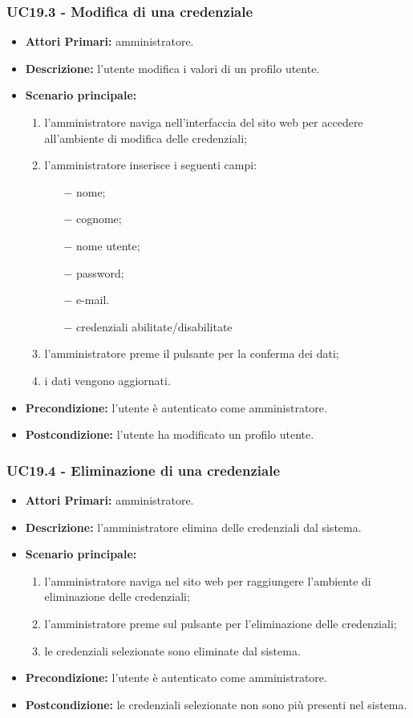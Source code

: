 \subsubsection{ UC19.3 - Modifica di una credenziale}
\begin{itemize}
	\item\textbf{Attori Primari:} 
	amministratore.
	\item\textbf{Descrizione:} 
	l'utente modifica i valori di un profilo utente.
	\item\textbf{Scenario principale:} 
	\begin{enumerate}
		\item l'amministratore naviga nell'interfaccia del sito web per accedere all'ambiente di modifica delle credenziali;
		\item l'amministratore inserisce i seguenti campi:
		\begin{itemize}
			\item[$-$] nome;
			\item[$-$] cognome;
			\item[$-$] nome utente;
			\item[$-$] password;
			\item[$-$] e-mail.
			\item[$-$] credenziali abilitate/disabilitate
		\end{itemize}		
		\item l'amministratore preme il pulsante per la conferma dei dati;
		\item i dati vengono aggiornati.
	\end{enumerate}
	\item\textbf{Precondizione:} 
	l'utente è autenticato come amministratore.
	\item\textbf{Postcondizione:}
	l'utente ha modificato un profilo utente.
\end{itemize}

\subsubsection{ UC19.4 - Eliminazione di una credenziale}
\begin{itemize}
	\item\textbf{Attori Primari:} 
	amministratore.
	\item\textbf{Descrizione:} 
	l'amministratore elimina delle credenziali dal sistema.
	\item\textbf{Scenario principale:} 
	\begin{enumerate}
		\item l'amministratore naviga nel sito web per raggiungere l'ambiente di eliminazione delle credenziali;
		\item l'amministratore preme sul pulsante per l'eliminazione delle credenziali;
		\item le credenziali selezionate sono eliminate dal sistema.
	\end{enumerate}
	\item\textbf{Precondizione:} 
	l'utente è autenticato come amministratore.
	\item\textbf{Postcondizione:}
	le credenziali selezionate non sono più presenti nel sistema.
\end{itemize}

